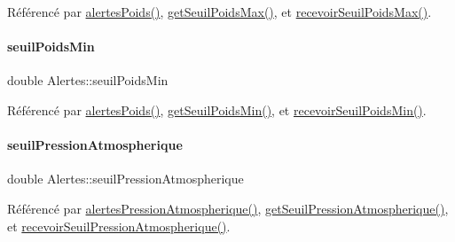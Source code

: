 Référencé par \hyperlink{class_alertes_ac4b8925cc6c262cf7254b1576ba07d33}{alertes\+Poids()}, \hyperlink{class_alertes_a2c19b460f7f7cc7a867b5ed634371878}{get\+Seuil\+Poids\+Max()}, et \hyperlink{class_alertes_a77b71a5bc047ced8d09f59a521f58616}{recevoir\+Seuil\+Poids\+Max()}.

\mbox{\label{class_alertes_a3f23bee8122888916e33559f4d0bf34b}} 
\paragraph{\texorpdfstring{seuil\+Poids\+Min}{seuilPoidsMin}}
{\footnotesize\ttfamily double Alertes\+::seuil\+Poids\+Min\hspace{0.3cm}{\ttfamily [private]}}



Référencé par \hyperlink{class_alertes_ac4b8925cc6c262cf7254b1576ba07d33}{alertes\+Poids()}, \hyperlink{class_alertes_a228829e2826ee20cc014b2eb54addf14}{get\+Seuil\+Poids\+Min()}, et \hyperlink{class_alertes_ab6a15b0c8387a2cdf47dacce92c60383}{recevoir\+Seuil\+Poids\+Min()}.

\mbox{\label{class_alertes_a565094789ef5eb0ae2a2a562ee8a9704}} 
\paragraph{\texorpdfstring{seuil\+Pression\+Atmospherique}{seuilPressionAtmospherique}}
{\footnotesize\ttfamily double Alertes\+::seuil\+Pression\+Atmospherique\hspace{0.3cm}{\ttfamily [private]}}



Référencé par \hyperlink{class_alertes_ab8a33e82cdd4d4e0560c9ba6e10ca8d5}{alertes\+Pression\+Atmospherique()}, \hyperlink{class_alertes_a502fa36037246fb6eaad1db859bc1971}{get\+Seuil\+Pression\+Atmospherique()}, et \hyperlink{class_alertes_a4496c251e1cde3e8c6beee64bad53fe3}{recevoir\+Seuil\+Pression\+Atmospherique()}.

\mbox{\label{class_alertes_adedb6924af18a7f7a14b11ffa33db6ba}} 

